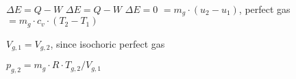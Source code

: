 \( \Delta E = Q - W \)  
\( \Delta E = Q - W \)  
\( \Delta E = 0 \)  
\( = m_{g} \cdot (u_{2} - u_{1}) \), perfect gas  
\( = m_{g} \cdot c_{v} \cdot (T_{2} - T_{1}) \)  

\( V_{g,1} = V_{g,2} \), since isochoric perfect gas  

\( p_{g,2} = m_{g} \cdot R \cdot T_{g,2} / V_{g,1} \)